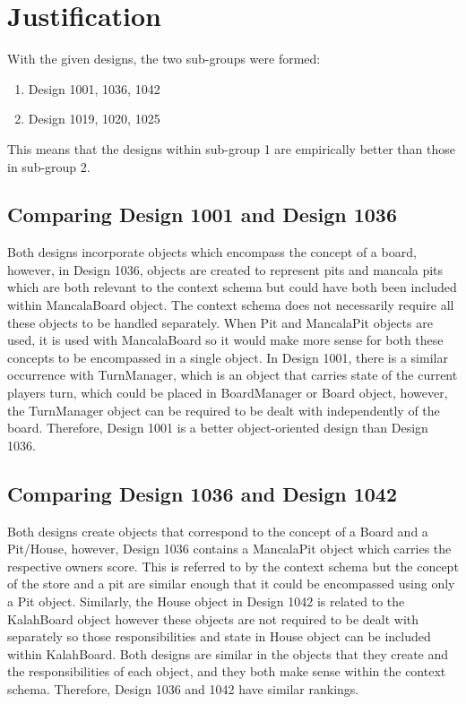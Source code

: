 \documentclass[conference]{IEEEtran}
\begin{document}
\section{Justification}
With the given designs, the two sub-groups were formed:
\begin{enumerate}
	\item Design 1001, 1036, 1042
	\item Design 1019, 1020, 1025
\end{enumerate}
This means that the designs within sub-group 1 are empirically better than those in sub-group 2. 

\subsection{Comparing Design 1001 and Design 1036}
Both designs incorporate objects which encompass the concept of a board, however, in Design 1036, objects are created to represent pits and mancala pits which are both relevant to the context schema but could have both been included within MancalaBoard object. The context schema does not necessarily require all these objects to be handled separately. When Pit and MancalaPit objects are used, it is used with MancalaBoard so it would make more sense for both these concepts to be encompassed in a single object. In Design 1001, there is a similar occurrence with TurnManager, which is an object that carries state of the current players turn, which could be placed in BoardManager or Board object, however, the TurnManager object can be required to be dealt with independently of the board. Therefore, Design 1001 is a better object-oriented design than Design 1036.

\subsection{Comparing Design 1036 and Design 1042}
Both designs create objects that correspond to the concept of a Board and a Pit/House, however, Design 1036 contains a MancalaPit object which carries the respective owners score. This is referred to by the context schema but the concept of the store and a pit are similar enough that it could be encompassed using only a Pit object. Similarly, the House object in Design 1042 is related to the KalahBoard object however these objects are not required to be dealt with separately so those responsibilities and state in House object can be included within KalahBoard. Both designs are similar in the objects that they create and the responsibilities of each object, and they both make sense within the context schema. Therefore, Design 1036 and 1042 have similar rankings.
\end{document}
